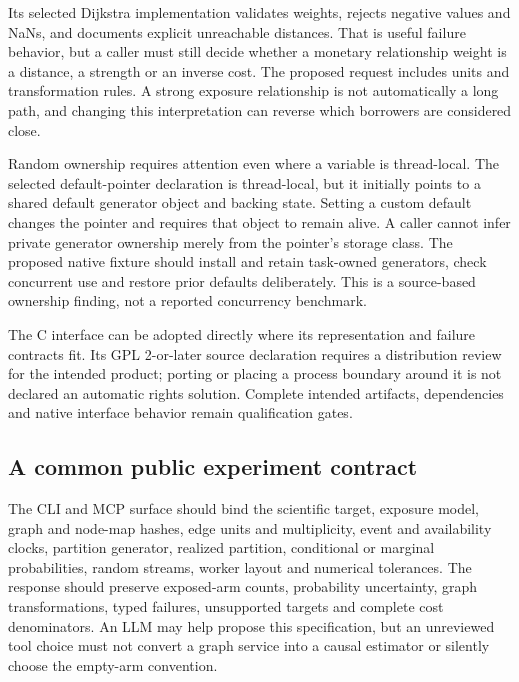 Its selected Dijkstra implementation validates weights, rejects negative values and NaNs, and documents explicit unreachable distances. That is useful failure behavior, but a caller must still decide whether a monetary relationship weight is a distance, a strength or an inverse cost. The proposed request includes units and transformation rules. A strong exposure relationship is not automatically a long path, and changing this interpretation can reverse which borrowers are considered close.~\citep{exec25_cnet_igraph,exec25_cnet_choice}

Random ownership requires attention even where a variable is thread-local. The selected default-pointer declaration is thread-local, but it initially points to a shared default generator object and backing state. Setting a custom default changes the pointer and requires that object to remain alive. A caller cannot infer private generator ownership merely from the pointer's storage class. The proposed native fixture should install and retain task-owned generators, check concurrent use and restore prior defaults deliberately. This is a source-based ownership finding, not a reported concurrency benchmark.~\citep{exec25_cnet_igraph}

The C interface can be adopted directly where its representation and failure contracts fit. Its GPL 2-or-later source declaration requires a distribution review for the intended product; porting or placing a process boundary around it is not declared an automatic rights solution. Complete intended artifacts, dependencies and native interface behavior remain qualification gates.~\citep{exec25_cnet_igraph,exec25_cnet_choice}

\subsection{A common public experiment contract}

The CLI and MCP surface should bind the scientific target, exposure model, graph and node-map hashes, edge units and multiplicity, event and availability clocks, partition generator, realized partition, conditional or marginal probabilities, random streams, worker layout and numerical tolerances. The response should preserve exposed-arm counts, probability uncertainty, graph transformations, typed failures, unsupported targets and complete cost denominators. An LLM may help propose this specification, but an unreviewed tool choice must not convert a graph service into a causal estimator or silently choose the empty-arm convention.~\citep{exec25_cnet_choice}

